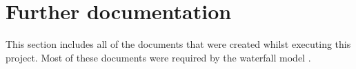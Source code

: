 \chapter{Further documentation}

This section includes all of the documents that were created whilst executing this project. Most of these documents were required by the waterfall model \cite{waterfall}.


 
 
 
 
 
